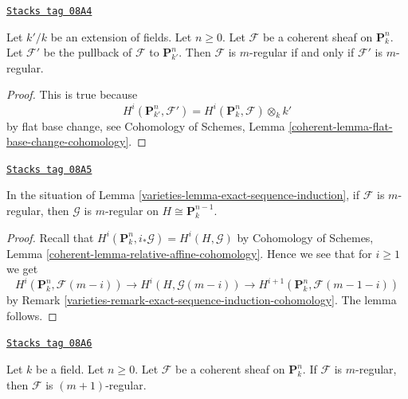\begin{lemma}
\label{varieties-lemma-m-regular-extend-base-field}
\href{https://stacks.math.columbia.edu/tag/08A4}{\texttt{Stacks tag 08A4}}

Let $k'/k$ be an extension of fields. Let $n \geq 0$.
Let $\mathcal{F}$ be a coherent sheaf on $\mathbf{P}^n_k$.
Let $\mathcal{F}'$ be the pullback of $\mathcal{F}$ to $\mathbf{P}^n_{k'}$.
Then $\mathcal{F}$ is $m$-regular if and only if $\mathcal{F}'$ is
$m$-regular.
\end{lemma}

\begin{proof}
This is true because
$$
H^i(\mathbf{P}^n_{k'}, \mathcal{F}') =
H^i(\mathbf{P}^n_k, \mathcal{F}) \otimes_k k'
$$
by flat base change, see
Cohomology of Schemes, Lemma \ref{coherent-lemma-flat-base-change-cohomology}.
\end{proof}

\begin{lemma}[M regular]
\label{varieties-lemma-m-regular}
\href{https://stacks.math.columbia.edu/tag/08A5}{\texttt{Stacks tag 08A5}}

In the situation of Lemma \ref{varieties-lemma-exact-sequence-induction},
if $\mathcal{F}$ is $m$-regular, then $\mathcal{G}$ is $m$-regular
on $H \cong \mathbf{P}^{n - 1}_k$.
\end{lemma}

\begin{proof}

Recall that $H^i(\mathbf{P}^n_k, i_*\mathcal{G}) = H^i(H, \mathcal{G})$ by
Cohomology of Schemes, Lemma \ref{coherent-lemma-relative-affine-cohomology}.
Hence we see that for $i \geq 1$ we get
$$
H^i(\mathbf{P}^n_k, \mathcal{F}(m - i)) \to
H^i(H, \mathcal{G}(m - i)) \to
H^{i + 1}(\mathbf{P}^n_k, \mathcal{F}(m - 1 - i))
$$
by Remark \ref{varieties-remark-exact-sequence-induction-cohomology}.
The lemma follows.
\end{proof}

\begin{lemma}[M regular up]
\label{varieties-lemma-m-regular-up}
\href{https://stacks.math.columbia.edu/tag/08A6}{\texttt{Stacks tag 08A6}}

Let $k$ be a field. Let $n \geq 0$.
Let $\mathcal{F}$ be a coherent sheaf on $\mathbf{P}^n_k$.
If $\mathcal{F}$ is $m$-regular, then $\mathcal{F}$ is
$(m + 1)$-regular.
\end{lemma}

